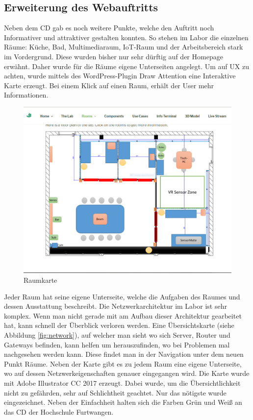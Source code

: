 \subsection{Erweiterung des Webauftritts}
Neben dem \acf{CD} gab es noch weitere Punkte, welche den Auftritt noch Informativer und attraktiver gestalten konnten. So stehen im Labor die einzelnen Räume: Küche, Bad, Multimediaraum, IoT-Raum und der Arbeitsbereich stark im Vordergrund. Diese wurden bisher nur sehr dürftig auf der Homepage erwähnt. Daher wurde für die Räume eigene Unterseiten angelegt. Um auf \acf{UX} zu achten, wurde mittels des WordPress-Plugin Draw Attention  eine Interaktive Karte erzeugt. Bei einem Klick auf einen Raum, erhält der User mehr Informationen. \autocite{WPDrawAttention.}

\begin{figure}[bh]
	\centering
	\includegraphics[scale=0.35]{content/pictures/room.jpg}
	\caption{Raumkarte}
	\label{fig:room}
\end{figure}

Jeder Raum hat seine eigene Unterseite, welche die Aufgaben des Raumes und dessen Ausstattung beschreibt.
\newpage
Die Netzwerkarchitektur im Labor ist sehr komplex. Wenn man nicht gerade mit am Aufbau dieser Architektur gearbeitet hat, kann schnell der Überblick verloren werden. Eine Übersichtskarte (siehe Abbildung \ref{fig:network}), auf welcher man sieht wo sich Server, Router und Gateways befinden, kann helfen um herauszufinden, wo bei Problemen mal nachgesehen werden kann. Diese findet man in der Navigation unter dem neuen Punkt Räume. Neben der Karte gibt es zu jedem Raum eine eigene Unterseite, wo auf dessen Netzwerkeigenschaften genauer eingegangen wird. Die Karte wurde mit Adobe Illustrator CC 2017 erzeugt. Dabei wurde, um die Übersichtlichkeit nicht zu gefährden, sehr auf Schlichtheit geachtet. Nur das nötigste wurde eingezeichnet. Neben der Einfachheit halten sich die Farben Grün und Weiß an das \ac{CD} der Hochschule Furtwangen.

